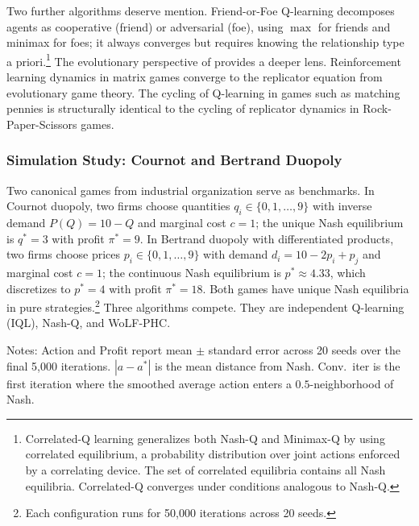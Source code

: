 Two further algorithms deserve mention. Friend-or-Foe Q-learning \citep{littman2001friend} decomposes agents as cooperative (friend) or adversarial (foe), using $\max$ for friends and minimax for foes; it always converges but requires knowing the relationship type a priori.\footnote{Correlated-Q learning \citep{greenwald2003correlated} generalizes both Nash-Q and Minimax-Q by using correlated equilibrium, a probability distribution over joint actions enforced by a correlating device. The set of correlated equilibria contains all Nash equilibria. Correlated-Q converges under conditions analogous to Nash-Q.} The evolutionary perspective of \citet{borgers1997learning} provides a deeper lens. Reinforcement learning dynamics in matrix games converge to the replicator equation from evolutionary game theory. The cycling of Q-learning in games such as matching pennies is structurally identical to the cycling of replicator dynamics in Rock-Paper-Scissors games.

\subsubsection{Simulation Study: Cournot and Bertrand Duopoly}
\label{sec:cournot_bertrand}

Two canonical games from industrial organization serve as benchmarks. In Cournot duopoly, two firms choose quantities $q_i \in \{0, 1, \ldots, 9\}$ with inverse demand $P(Q) = 10 - Q$ and marginal cost $c = 1$; the unique Nash equilibrium is $q^* = 3$ with profit $\pi^* = 9$. In Bertrand duopoly with differentiated products, two firms choose prices $p_i \in \{0, 1, \ldots, 9\}$ with demand $d_i = 10 - 2p_i + p_j$ and marginal cost $c = 1$; the continuous Nash equilibrium is $p^* \approx 4.33$, which discretizes to $p^* = 4$ with profit $\pi^* = 18$. Both games have unique Nash equilibria in pure strategies.\footnote{Each configuration runs for 50,000 iterations across 20 seeds.} Three algorithms compete. They are independent Q-learning (IQL), Nash-Q, and WoLF-PHC.

\begin{table}[htbp]
\centering
\caption[Convergence to Nash equilibrium in Cournot and Bertrand duopoly]{\textbf{Convergence to Nash equilibrium in Cournot and Bertrand duopoly.}}
\label{tab:cournot_bertrand}

\begin{minipage}{0.9\textwidth}
\footnotesize
Notes: Action and Profit report mean $\pm$ standard error across 20 seeds over the final 5,000 iterations. $|a - a^*|$ is the mean distance from Nash. Conv.\ iter is the first iteration where the smoothed average action enters a $0.5$-neighborhood of Nash.
\end{minipage}
\end{table}

